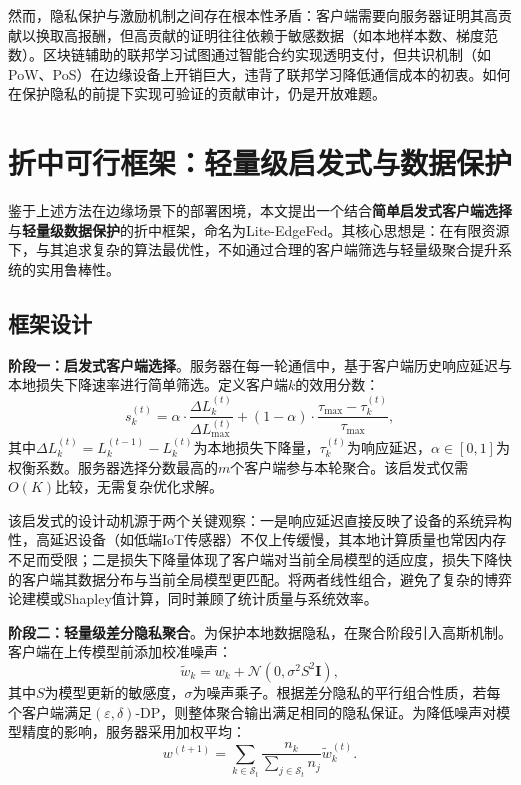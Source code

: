 \documentclass[a4paper,12pt]{article}
\begin{document}
然而，隐私保护与激励机制之间存在根本性矛盾：客户端需要向服务器证明其高贡献以换取高报酬，但高贡献的证明往往依赖于敏感数据（如本地样本数、梯度范数）。区块链辅助的联邦学习试图通过智能合约实现透明支付，但共识机制（如PoW、PoS）在边缘设备上开销巨大，违背了联邦学习降低通信成本的初衷。如何在保护隐私的前提下实现可验证的贡献审计，仍是开放难题。

\section{折中可行框架：轻量级启发式与数据保护}

鉴于上述方法在边缘场景下的部署困境，本文提出一个结合\textbf{简单启发式客户端选择}与\textbf{轻量级数据保护}的折中框架，命名为Lite-EdgeFed。其核心思想是：在有限资源下，与其追求复杂的算法最优性，不如通过合理的客户端筛选与轻量级聚合提升系统的实用鲁棒性。

\subsection{框架设计}

\textbf{阶段一：启发式客户端选择}。服务器在每一轮通信中，基于客户端历史响应延迟与本地损失下降速率进行简单筛选。定义客户端$k$的效用分数：
\begin{equation}
s_k^{(t)} = \alpha \cdot \frac{\Delta L_k^{(t)}}{\Delta L_{\max}^{(t)}} + (1-\alpha) \cdot \frac{\tau_{\max} - \tau_k^{(t)}}{\tau_{\max}},
\label{eq:score}
\end{equation}
其中$\Delta L_k^{(t)} = L_k^{(t-1)} - L_k^{(t)}$为本地损失下降量，$\tau_k^{(t)}$为响应延迟，$\alpha \in [0,1]$为权衡系数。服务器选择分数最高的$m$个客户端参与本轮聚合。该启发式仅需$O(K)$比较，无需复杂优化求解。

该启发式的设计动机源于两个关键观察：一是响应延迟直接反映了设备的系统异构性，高延迟设备（如低端IoT传感器）不仅上传缓慢，其本地计算质量也常因内存不足而受限；二是损失下降量体现了客户端对当前全局模型的适应度，损失下降快的客户端其数据分布与当前全局模型更匹配。将两者线性组合，避免了复杂的博弈论建模或Shapley值计算，同时兼顾了统计质量与系统效率。

\textbf{阶段二：轻量级差分隐私聚合}。为保护本地数据隐私，在聚合阶段引入高斯机制。客户端在上传模型前添加校准噪声：
\begin{equation}
\tilde{w}_k = w_k + \mathcal{N}(0, \sigma^2 S^2 \mathbf{I}),
\end{equation}
其中$S$为模型更新的敏感度，$\sigma$为噪声乘子。根据差分隐私的平行组合性质，若每个客户端满足$(\varepsilon, \delta)$-DP，则整体聚合输出满足相同的隐私保证。为降低噪声对模型精度的影响，服务器采用加权平均：
\begin{equation}
w^{(t+1)} = \sum_{k \in \mathcal{S}_t} \frac{n_k}{\sum_{j \in \mathcal{S}_t} n_j} \tilde{w}_k^{(t)}.
\end{equation}
\end{document}

